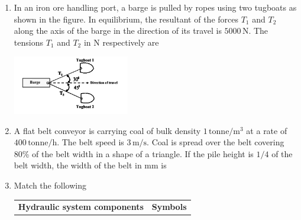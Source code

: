 \documentclass[journal]{IEEEtran}
\begin{document}
\begin{enumerate}
\item In an iron ore handling port, a barge is pulled by ropes using two tugboats as shown in the figure. In equilibrium, the resultant of the forces $T_1$ and $T_2$ along the axis of the barge in the direction of its travel is $5000 \, \mathrm{N}$. The tensions $T_1$ and $T_2$ in N respectively are

\begin{center}
\includegraphics[width=0.4\textwidth]{Screenshot_2025_0813_192351.png}
\end{center}

\begin{enumerate}
\end{enumerate}

\item A flat belt conveyor is carrying coal of bulk density $1\, \mathrm{tonne/m^3}$ at a rate of $400 \, \mathrm{tonne/h}$. The belt speed is $3\, \mathrm{m/s}$. Coal is spread over the belt covering 80\% of the belt width in a shape of a triangle. If the pile height is $1/4$ of the belt width, the width of the belt in mm is
\begin{enumerate}
\end{enumerate}

\item Match the following

\begin{tabular}{|>{\raggedright}m{5cm}|c|}

\textbf{Hydraulic system components} & \textbf{Symbols} \\


\end{tabular}
\end{enumerate}
\end{document}
